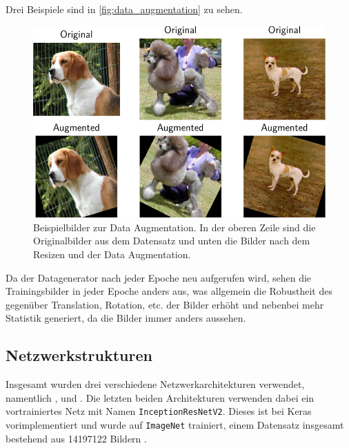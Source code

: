 Drei Beispiele sind in \autoref{fig:data_augmentation} zu sehen.

\begin{figure}
  \centering
  \includegraphics[scale=0.8]{pics/subplot.pdf}
  \caption{Beispielbilder zur Data Augmentation. In der oberen Zeile sind die
  Originalbilder aus dem Datensatz und unten die Bilder nach dem Resizen und der Data Augmentation.}
  \label{fig:data_augmentation}
\end{figure}

Da der Datagenerator nach jeder Epoche neu aufgerufen wird, sehen die
Trainingsbilder in jeder Epoche anders aus, was allgemein die Robustheit des
\CNN{} gegenüber Translation, Rotation, etc. der Bilder erhöht und nebenbei mehr
Statistik generiert, da die Bilder immer anders aussehen.

\subsection{Netzwerkstrukturen}
\label{sec:netzwerk}
Insgesamt wurden drei verschiedene Netzwerkarchitekturen verwendet, namentlich
\MiniDog{}, \PreDog{} und \PreBig{}. Die letzten beiden Architekturen verwenden dabei
ein vortrainiertes Netz mit Namen \texttt{InceptionResNetV2}. Dieses ist bei
Keras vorimplementiert \cite{inception} und wurde auf \texttt{ImageNet}
trainiert, einem Datensatz insgesamt bestehend aus 14197122 Bildern
\cite{imagenet}.

